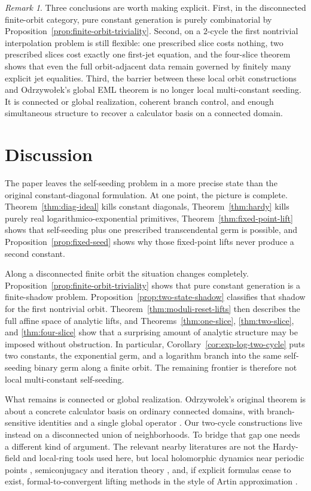 \documentclass[11pt]{amsart}
\numberwithin{equation}{section}
\theoremstyle{remark}
\newtheorem{remark}[theorem]{Remark}
\theoremstyle{definition}
\begin{document}
\begin{remark}
Three conclusions are worth making explicit. First, in the disconnected finite-orbit category, pure constant generation is purely combinatorial by Proposition~\ref{prop:finite-orbit-triviality}. Second, on a $2$-cycle the first nontrivial interpolation problem is still flexible: one prescribed slice costs nothing, two prescribed slices cost exactly one first-jet equation, and the four-slice theorem shows that even the full orbit-adjacent data remain governed by finitely many explicit jet equalities. Third, the barrier between these local orbit constructions and Odrzywo{\l}ek's global EML theorem is no longer local multi-constant seeding. It is connected or global realization, coherent branch control, and enough simultaneous structure to recover a calculator basis on a connected domain.
\end{remark}

\section{Discussion}\label{sec:discussion}

The paper leaves the self-seeding problem in a more precise state than the original constant-diagonal formulation. At one point, the picture is complete. Theorem~\ref{thm:diag-ideal} kills constant diagonals, Theorem~\ref{thm:hardy} kills purely real logarithmico-exponential primitives, Theorem~\ref{thm:fixed-point-lift} shows that self-seeding plus one prescribed transcendental germ is possible, and Proposition~\ref{prop:fixed-seed} shows why those fixed-point lifts never produce a second constant.

Along a disconnected finite orbit the situation changes completely. Proposition~\ref{prop:finite-orbit-triviality} shows that pure constant generation is a finite-shadow problem. Proposition~\ref{prop:two-state-shadow} classifies that shadow for the first nontrivial orbit. Theorem~\ref{thm:moduli-reset-lifts} then describes the full affine space of analytic lifts, and Theorems~\ref{thm:one-slice}, \ref{thm:two-slice}, and \ref{thm:four-slice} show that a surprising amount of analytic structure may be imposed without obstruction. In particular, Corollary~\ref{cor:exp-log-two-cycle} puts two constants, the exponential germ, and a logarithm branch into the same self-seeding binary germ along a finite orbit. The remaining frontier is therefore not local multi-constant self-seeding.

What remains is connected or global realization. Odrzywo{\l}ek's original theorem is about a concrete calculator basis on ordinary connected domains, with branch-sensitive identities and a single global operator \cite{Odrzywolek2026}. Our two-cycle constructions live instead on a disconnected union of neighborhoods. To bridge that gap one needs a different kind of argument. The relevant nearby literatures are not the Hardy-field and local-ring tools used here, but local holomorphic dynamics near periodic points \cite{Abate2010}, semiconjugacy and iteration theory \cite{Pakovich2016}, and, if explicit formulas cease to exist, formal-to-convergent lifting methods in the style of Artin approximation \cite{Hauser2017}.
\end{document}
